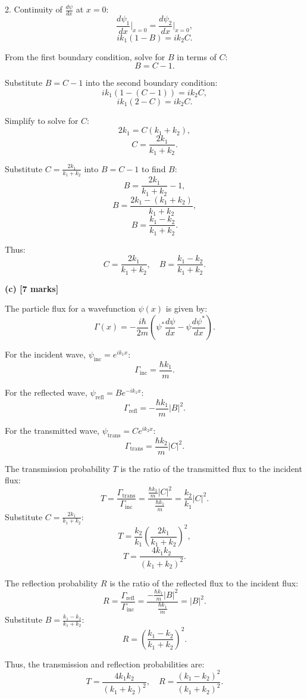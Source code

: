 \documentclass{article}
\begin{document}
2. Continuity of $\frac{d\psi}{dx}$ at $x = 0$:
\[
\frac{d\psi_1}{dx}\bigg|_{x=0} = \frac{d\psi_2}{dx}\bigg|_{x=0},
\]
\[
ik_1(1 - B) = ik_2C.
\]

From the first boundary condition, solve for $B$ in terms of $C$:
\[
B = C - 1.
\]

Substitute $B = C - 1$ into the second boundary condition:
\[
ik_1(1 - (C - 1)) = ik_2C,
\]
\[
ik_1(2 - C) = ik_2C.
\]

Simplify to solve for $C$:
\[
2k_1 = C(k_1 + k_2),
\]
\[
C = \frac{2k_1}{k_1 + k_2}.
\]

Substitute $C = \frac{2k_1}{k_1 + k_2}$ into $B = C - 1$ to find $B$:
\[
B = \frac{2k_1}{k_1 + k_2} - 1,
\]
\[
B = \frac{2k_1 - (k_1 + k_2)}{k_1 + k_2},
\]
\[
B = \frac{k_1 - k_2}{k_1 + k_2}.
\]

Thus:
\[
C = \frac{2k_1}{k_1 + k_2}, \quad B = \frac{k_1 - k_2}{k_1 + k_2}.
\]

\textbf{(c) [7 marks]}

The particle flux for a wavefunction $\psi(x)$ is given by:
\[
\Gamma(x) = -\frac{i\hbar}{2m} \left( \psi^* \frac{d\psi}{dx} - \psi \frac{d\psi^*}{dx} \right).
\]

For the incident wave, $\psi_\text{inc} = e^{ik_1x}$:
\[
\Gamma_\text{inc} = \frac{\hbar k_1}{m}.
\]

For the reflected wave, $\psi_\text{refl} = Be^{-ik_1x}$:
\[
\Gamma_\text{refl} = -\frac{\hbar k_1}{m} |B|^2.
\]

For the transmitted wave, $\psi_\text{trans} = Ce^{ik_2x}$:
\[
\Gamma_\text{trans} = \frac{\hbar k_2}{m} |C|^2.
\]

The transmission probability $T$ is the ratio of the transmitted flux to the incident flux:
\[
T = \frac{\Gamma_\text{trans}}{\Gamma_\text{inc}} = \frac{\frac{\hbar k_2}{m} |C|^2}{\frac{\hbar k_1}{m}} = \frac{k_2}{k_1} |C|^2.
\]
Substitute $C = \frac{2k_1}{k_1 + k_2}$:
\[
T = \frac{k_2}{k_1} \left(\frac{2k_1}{k_1 + k_2}\right)^2,
\]
\[
T = \frac{4k_1k_2}{(k_1 + k_2)^2}.
\]

The reflection probability $R$ is the ratio of the reflected flux to the incident flux:
\[
R = \frac{\Gamma_\text{refl}}{\Gamma_\text{inc}} = \frac{-\frac{\hbar k_1}{m} |B|^2}{\frac{\hbar k_1}{m}} = |B|^2.
\]
Substitute $B = \frac{k_1 - k_2}{k_1 + k_2}$:
\[
R = \left(\frac{k_1 - k_2}{k_1 + k_2}\right)^2.
\]

Thus, the transmission and reflection probabilities are:
\[
T = \frac{4k_1k_2}{(k_1 + k_2)^2}, \quad R = \frac{(k_1 - k_2)^2}{(k_1 + k_2)^2}.
\]
\end{document}
